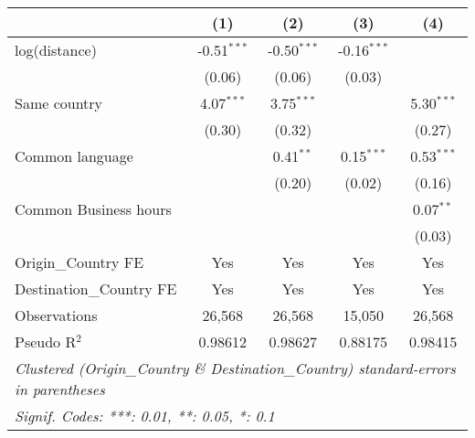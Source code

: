 
\begingroup
\centering
\small
\begin{tabular}{lcccc}
   \toprule
                            & (1)           & (2)           & (3)           & (4)\\  
   \midrule 
   log(distance)            & -0.51$^{***}$ & -0.50$^{***}$ & -0.16$^{***}$ &   \\   
                            & (0.06)        & (0.06)        & (0.03)        &   \\   
   Same country             & 4.07$^{***}$  & 3.75$^{***}$  &               & 5.30$^{***}$\\   
                            & (0.30)        & (0.32)        &               & (0.27)\\   
   Common language          &               & 0.41$^{**}$   & 0.15$^{***}$  & 0.53$^{***}$\\   
                            &               & (0.20)        & (0.02)        & (0.16)\\   
   Common Business hours    &               &               &               & 0.07$^{**}$\\   
                            &               &               &               & (0.03)\\   
   \midrule 
   Origin\_Country FE       & Yes           & Yes           & Yes           & Yes\\  
   Destination\_Country FE  & Yes           & Yes           & Yes           & Yes\\  
   \midrule 
   Observations             & 26,568        & 26,568        & 15,050        & 26,568\\  
   Pseudo R$^2$             & 0.98612       & 0.98627       & 0.88175       & 0.98415\\  
   \bottomrule
   \multicolumn{5}{l}{\emph{Clustered (Origin\_Country \& Destination\_Country) standard-errors in parentheses}}\\
   \multicolumn{5}{l}{\emph{Signif. Codes: ***: 0.01, **: 0.05, *: 0.1}}\\
\end{tabular}
\par\endgroup


